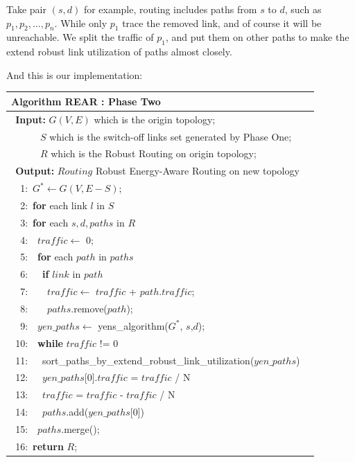 \documentclass[conference]{IEEEtran}
\begin{document}
Take pair $(s, d)$ for example, routing includes paths from $s$ to $d$, such as $p_1, p_2, ... , p_n$. While only $p_1$ trace
the removed link, and of course it will be unreachable. We split the traffic of $p_1$, and put them on other paths to make
the extend robust link utilization of paths almost closely.


And this is our implementation:
\begin{table}[!th]
\begin{tabular}{ll}
\hline
\textbf{Algorithm REAR : Phase Two}\\
\hline
$\:\:$\textbf{Input:} $G(V,E)$ which is the origin topology;\\
$\quad\quad\ \ \ $ $S$ which is the switch-off links set generated by Phase One;\\
$\quad\quad\ \ \ $ $R$ which is the Robust Routing on origin topology;\\
$\:\:$\textbf{Output:} $Routing$ Robust Energy-Aware Routing on new topology\\
$\:\:$\ 1:\ $G^* \leftarrow G(V, E-S)$;\\
$\:\:$\ 2:\ \textbf{for} {each link $l$ in $S$}\\
$\:\:$\ 3:\quad\ \textbf{for} {each $s,d,paths$ in $R$}\\
$\:\:$\ 4:\quad\ \quad\ $traffic \leftarrow$ 0;\\
$\:\:$\ 5:\quad\ \quad\ \textbf{for} {each $path$ in $paths$}\\
$\:\:$\ 6:\quad\ \quad\ \quad\ \textbf{if} {$link$ in $path$}\\
$\:\:$\ 7:\quad\ \quad\ \quad\ \quad\ $traffic \leftarrow$ $traffic$ + $path$.$traffic$; \\
$\:\:$\ 8:\quad\ \quad\ \quad\ \quad\ $paths$.remove($path$); \\
$\:\:$\ 9:\quad\ \quad\ $yen\_paths \leftarrow$ yens\_algorithm($G^*$, $s$,$d$);\\
$\:\:$10:\quad\ \quad\ \textbf{while} {$traffic$ != 0}\\
$\:\:$11:\quad\ \quad\ \quad\ sort\_paths\_by\_extend\_robust\_link\_utilization($yen\_paths$)\\
$\:\:$12:\quad\ \quad\ \quad\ $yen\_paths$[0].$traffic$ = $traffic$ / N\\
$\:\:$13:\quad\ \quad\ \quad\ $traffic$ = $traffic$ - $traffic$ / N\\
$\:\:$14:\quad\ \quad\ \quad\ $paths$.add($yen\_paths$[0])\\
$\:\:$15:\quad\ \quad\ $paths$.merge();\\
$\:\:$16:\ \textbf{return} $R$;\\
\hline
\end{tabular}
\end{table}
\end{document}
